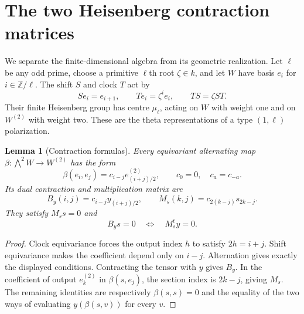 \documentclass[11pt]{article}
\newtheorem{lemma}[theorem]{Lemma}
\theoremstyle{definition}\newtheorem{definition}[theorem]{Definition}
\theoremstyle{remark}\newtheorem{remark}[theorem]{Remark}
\begin{document}
\section{The two Heisenberg contraction matrices}\label{sec:matrices}

We separate the finite-dimensional algebra from its geometric realization. Let $\ell$ be any odd prime, choose a primitive $\ell$th root $\zeta\in k$, and let $W$ have basis $e_i$ for $i\in\mathbb Z/\ell$. The shift $S$ and clock $T$ act by
\[
 Se_i=e_{i+1},\qquad Te_i=\zeta^i e_i,
 \qquad TS=\zeta ST.
\]
Their finite Heisenberg group has centre $\mu_\ell$, acting on $W$ with weight one and on $W^{(2)}$ with weight two. These are the theta representations of a type $(1,\ell)$ polarization.

\begin{lemma}[Contraction formulas]\label{lem:matrices}
Every equivariant alternating map $\beta:\bigwedge^2W\to W^{(2)}$ has the form
\begin{equation}\label{eq:tensor}
 \beta(e_i,e_j)=c_{i-j}e_{(i+j)/2}^{(2)},\qquad
 c_0=0,\quad c_a=c_{-a}.
\end{equation}
Its dual contraction and multiplication matrix are
\begin{equation}\label{eq:matrices}
 B_y(i,j)=c_{i-j}y_{(i+j)/2},\qquad
 M_s(k,j)=c_{2(k-j)}s_{2k-j}.
\end{equation}
They satisfy $M_ss=0$ and
\begin{equation}\label{eq:incidence}
 B_ys=0\quad\Longleftrightarrow\quad M_s^t y=0.
\end{equation}
\end{lemma}
\begin{proof}
Clock equivariance forces the output index $h$ to satisfy $2h=i+j$. Shift equivariance makes the coefficient depend only on $i-j$. Alternation gives exactly the displayed conditions. Contracting the tensor with $y$ gives $B_y$. In the coefficient of output $e_k^{(2)}$ in $\beta(s,e_j)$, the section index is $2k-j$, giving $M_s$. The remaining identities are respectively $\beta(s,s)=0$ and the equality of the two ways of evaluating $y(\beta(s,v))$ for every $v$.
\end{proof}
\end{document}
